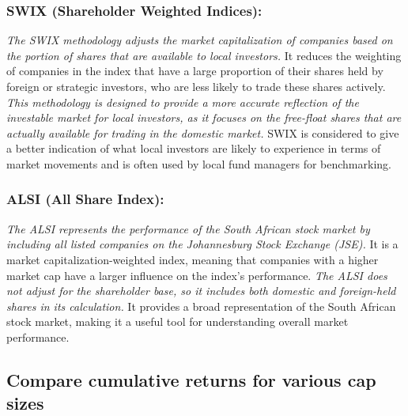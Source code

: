 \documentclass[11pt,preprint, authoryear]{elsarticle}
\numberwithin{equation}{section}
\numberwithin{figure}{section}
\numberwithin{table}{section}
\begin{document}
\hypertarget{swix-shareholder-weighted-indices}{%
\subsubsection*{SWIX (Shareholder Weighted
Indices):}\label{swix-shareholder-weighted-indices}}

\emph{The SWIX methodology adjusts the market capitalization of
companies based on the portion of shares that are available to local
investors. }It reduces the weighting of companies in the index that have
a large proportion of their shares held by foreign or strategic
investors, who are less likely to trade these shares actively.
\emph{This methodology is designed to provide a more accurate reflection
of the investable market for local investors, as it focuses on the
free-float shares that are actually available for trading in the
domestic market. }SWIX is considered to give a better indication of what
local investors are likely to experience in terms of market movements
and is often used by local fund managers for benchmarking.

\hypertarget{alsi-all-share-index}{%
\subsubsection*{ALSI (All Share Index):}\label{alsi-all-share-index}}

\emph{The ALSI represents the performance of the South African stock
market by including all listed companies on the Johannesburg Stock
Exchange (JSE). }It is a market capitalization-weighted index, meaning
that companies with a higher market cap have a larger influence on the
index's performance. \emph{The ALSI does not adjust for the shareholder
base, so it includes both domestic and foreign-held shares in its
calculation. }It provides a broad representation of the South African
stock market, making it a useful tool for understanding overall market
performance.

\hypertarget{compare-cumulative-returns-for-various-cap-sizes}{%
\subsection*{Compare cumulative returns for various cap
sizes}\label{compare-cumulative-returns-for-various-cap-sizes}}
\end{document}
